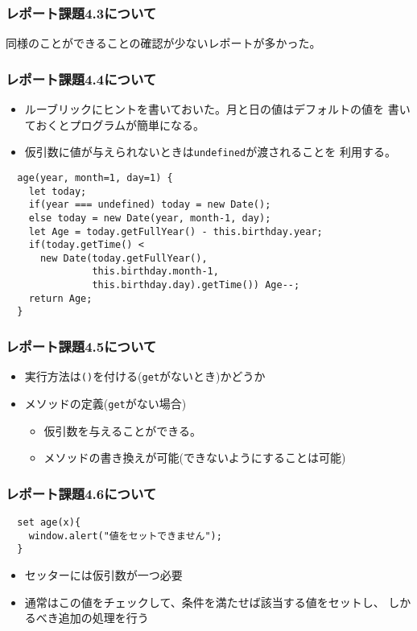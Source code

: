 \begin{frame}[containsverbatim]
 \frametitle{レポート課題4.3について}
 同様のことができることの確認が少ないレポートが多かった。
\end{frame}
\begin{frame}[containsverbatim]
 \frametitle{レポート課題4.4について}
\begin{itemize}
 \item ルーブリックにヒントを書いておいた。月と日の値はデフォルトの値を
       書いておくとプログラムが簡単になる。
 \item 仮引数に値が与えられないときは\texttt{undefined}が渡されることを
       利用する。
\end{itemize}
 {\small
\begin{Verbatim}
  age(year, month=1, day=1) {
    let today;
    if(year === undefined) today = new Date();
    else today = new Date(year, month-1, day);
    let Age = today.getFullYear() - this.birthday.year;
    if(today.getTime() <
      new Date(today.getFullYear(),
               this.birthday.month-1,
               this.birthday.day).getTime()) Age--;
    return Age;
  }
\end{Verbatim}
 }
\end{frame}
\begin{frame}[containsverbatim]
 \frametitle{レポート課題4.5について}
 \begin{itemize}
  \item 実行方法は\texttt{()}を付ける(\texttt{get}がないとき)かどうか
  \item メソッドの定義(\texttt{get}がない場合)
        \begin{itemize}
         \item 仮引数を与えることができる。
         \item メソッドの書き換えが可能(できないようにすることは可能)
        \end{itemize}
 \end{itemize}
\end{frame}
\begin{frame}[containsverbatim]
 \frametitle{レポート課題4.6について}
\begin{Verbatim}
  set age(x){
    window.alert("値をセットできません");
  }
\end{Verbatim}
\begin{itemize}
 \item セッターには仮引数が一つ必要
 \item 通常はこの値をチェックして、条件を満たせば該当する値をセットし、
       しかるべき追加の処理を行う
\end{itemize}
\end{frame}
